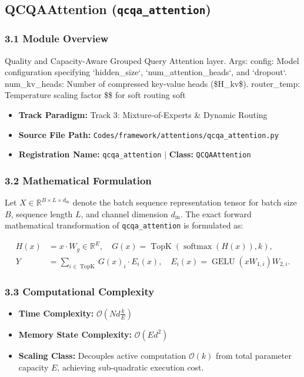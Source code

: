 \subsection{QCQAAttention (\texttt{qcqa\_attention})}
\label{sec:app_module_qcqa_attention}

\subsubsection*{3.1 Module Overview}
Quality and Capacity-Aware Grouped Query Attention layer.  Args:     config: Model configuration specifying `hidden\_size`, `num\_attention\_heads`, and `dropout`.     num\_kv\_heads: Number of compressed key-value heads (\$H\_{kv}\$).     router\_temp: Temperature scaling factor \$\tau\$ for soft routing soft
\begin{itemize}
    \item \textbf{Track Paradigm:} Track 3: Mixture-of-Experts & Dynamic Routing
    \item \textbf{Source File Path:} \texttt{Codes/framework/attentions/qcqa\_attention.py}
    \item \textbf{Registration Name:} \texttt{qcqa\_attention} $\mid$ \textbf{Class:} \texttt{QCQAAttention}
\end{itemize}

\subsubsection*{3.2 Mathematical Formulation}
Let $X \in \mathbb{R}^{B \times L \times d_{\text{in}}}$ denote the batch sequence representation tensor for batch size $B$, sequence length $L$, and channel dimension $d_{\text{in}}$. The exact forward mathematical transformation of \texttt{qcqa\_attention} is formulated as:

\begin{align}
H(x) &= x \cdot W_g \in \mathbb{R}^{E}, \quad G(x) = \operatorname{TopK}\left(\operatorname{softmax}(H(x)), k\right), \\
Y &= \sum_{i \in \operatorname{TopK}} G(x)_i \cdot E_i(x), \quad E_i(x) = \operatorname{GELU}(x W_{1, i}) W_{2, i}.
\end{align}


\subsubsection*{3.3 Computational Complexity}
\begin{itemize}
    \item \textbf{Time Complexity:} $\mathcal{O}(N d \frac{k}{E})$
    \item \textbf{Memory State Complexity:} $\mathcal{O}(E d^2)$
    \item \textbf{Scaling Class:} Decouples active computation $\mathcal{O}(k)$ from total parameter capacity $E$, achieving sub-quadratic execution cost.
\end{itemize}

